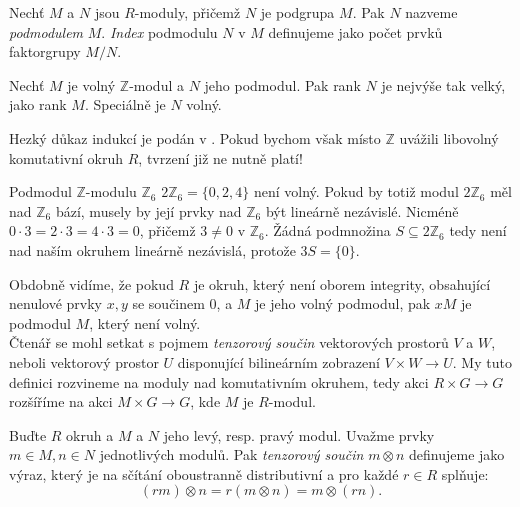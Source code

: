 \documentclass [12pt]{report}
\begin{document}
\begin{definice}
Nechť $M$ a $N$ jsou $R$-moduly, přičemž $N$ je podgrupa $M$. Pak $N$ nazveme \textit{podmodulem} $M$. \textit{Index} podmodulu $N$ v $M$ definujeme jako počet prvků faktorgrupy $M / N$.
\end{definice}

\begin{veta}\label{podmodul}
Nechť $M$ je volný $\mathbb{Z}$-modul a $N$ jeho podmodul. Pak rank $N$ je nejvýše tak velký, jako rank $M$. Speciálně je $N$ volný.
\end{veta}

Hezký důkaz indukcí je podán v \cite[Věta~1.3.8]{Pupik}. Pokud bychom však místo $\mathbb{Z}$ uvážili libovolný komutativní okruh $R$, tvrzení již ne nutně platí!
\begin{priklad}
Podmodul $\mathbb{Z}$-modulu $\mathbb{Z}_6$ $2\mathbb{Z}_6 = \lbrace 0,2,4 \rbrace$ není volný. Pokud by totiž modul $2 \mathbb{Z}_6$ měl nad $\mathbb{Z}_6$ bází, musely by její prvky nad $\mathbb{Z}_6$ být lineárně nezávislé. Nicméně $0 \cdot 3 = 2 \cdot 3  = 4 \cdot 3 = 0$, přičemž $3 \neq 0$ v $\mathbb{Z}_6$. Žádná podmnožina $S \subseteq 2 \mathbb{Z}_6$ tedy není nad naším okruhem lineárně nezávislá, protože $3 S = \lbrace 0 \rbrace$.
\end{priklad}

Obdobně vidíme, že pokud $R$ je okruh, který není oborem integrity, obsahující nenulové prvky $x, y$ se součinem $0$, a $M$ je jeho volný podmodul, pak $x M$ je podmodul $M$, který není volný.\\

Čtenář se mohl setkat s pojmem \textit{tenzorový součin} vektorových prostorů $V$ a $W$, neboli vektorový prostor $U$ disponující bilineárním zobrazení $V \times W \longrightarrow U$. My tuto definici rozvineme na moduly nad komutativním okruhem, tedy akci $R \times G \longrightarrow G$ rozšíříme na akci $M \times G \longrightarrow G$, kde $M$ je $R$-modul.

\begin{definice}
Buďte $R$ okruh a $M$ a $N$ jeho levý, resp. pravý modul. Uvažme prvky $m \in M,n \in N$ jednotlivých modulů. Pak \textit{tenzorový součin} $m \otimes n$ definujeme jako výraz, který je na sčítání oboustranně distributivní a pro každé $r \in R$ splňuje:
\begin{equation*}
(rm) \otimes n = r (m \otimes n) = m \otimes (rn).
\end{equation*}
\end{definice}
\end{document}
